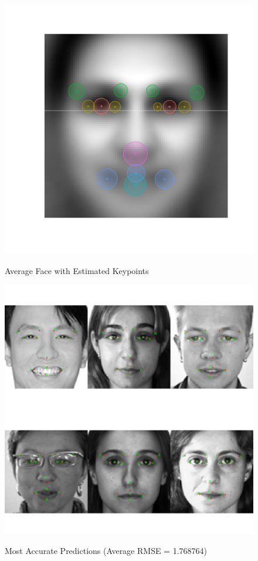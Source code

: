 \documentclass[journal]{IEEEtran}
\begin{document}
\begin{figure}[!htb]
  \centering
  \caption{Average Face with Estimated Keypoints}
  \includegraphics[scale=.5]{avg_face_rmse.pdf}
  \label{fig:avg_face_rmse}
\end{figure}

\begin{figure}[!htb]
  \centering
  \caption{Most Accurate Predictions (Average RMSE = 1.768764)}
  \includegraphics[scale=.6]{best_faces.pdf}
  \label{fig:best_faces}
\end{figure}
\end{document}

